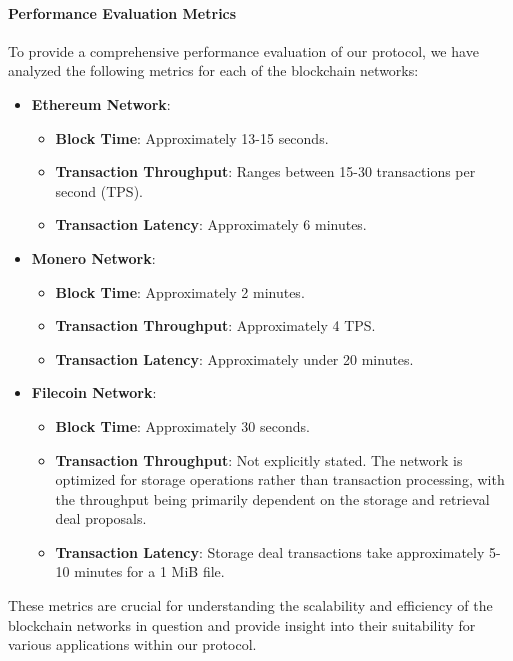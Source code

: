 \documentclass[pdftex,twocolumn,epjc3]{svjour3}
\begin{document}
\paragraph{Performance Evaluation Metrics}

To provide a comprehensive performance evaluation of our protocol, we have analyzed the following metrics for each of the blockchain networks:

\begin{itemize}
    \item \textbf{Ethereum Network}:
    \begin{itemize}
        \item \textbf{Block Time}: Approximately 13-15 seconds.
        \item \textbf{Transaction Throughput}: Ranges between 15-30 transactions per second (TPS).
        \item \textbf{Transaction Latency}: Approximately 6 minutes.
    \end{itemize}
    
    \item \textbf{Monero Network}:
    \begin{itemize}
        \item \textbf{Block Time}: Approximately 2 minutes.
        \item \textbf{Transaction Throughput}: Approximately 4 TPS.
        \item \textbf{Transaction Latency}: Approximately under 20 minutes.
    \end{itemize}
    
    \item \textbf{Filecoin Network}:
    \begin{itemize}
        \item \textbf{Block Time}: Approximately 30 seconds.
        \item \textbf{Transaction Throughput}: Not explicitly stated. The network is optimized for storage operations rather than transaction processing, with the throughput being primarily dependent on the storage and retrieval deal proposals.
        \item \textbf{Transaction Latency}: Storage deal transactions take approximately 5-10 minutes for a 1 MiB file.
    \end{itemize}
\end{itemize}

These metrics are crucial for understanding the scalability and efficiency of the blockchain networks in question and provide insight into their suitability for various applications within our protocol.
\end{document}
